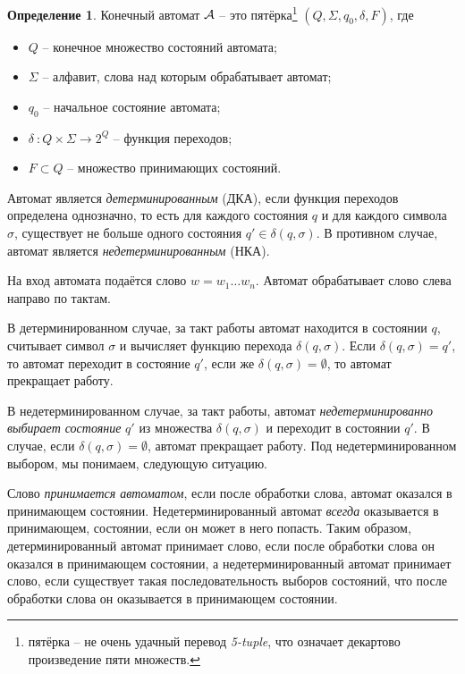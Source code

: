\documentclass[12pt]{article}
\theoremstyle{definiton}
\theoremstyle{definition}
\newtheorem{Def}{Определение}
\let\es\emptyset
\def\A{{\cal A}}
\begin{document}
	\begin{Def}
		Конечный автомат $\A$ -- это пятёрка\footnote{пятёрка -- не очень удачный перевод \emph{5-tuple}, что означает декартово произведение пяти множеств. } $(Q, \Sigma, q_0, \delta, F)$, где
		\begin{itemize}
			\item $Q$ -- конечное множество состояний автомата;
			\item $\Sigma$ -- алфавит, слова над которым обрабатывает автомат;
			\item $q_0$ -- начальное состояние автомата;
			\item $\delta\ : Q \times \Sigma \to 2^Q $ -- функция переходов;
			\item $F \subset Q$ -- множество принимающих состояний.
		\end{itemize}
	\end{Def}

	Автомат является \emph{детерминированным} (ДКА), если функция переходов определена однозначно, то есть для каждого состояния $q$ и для каждого символа $\sigma$, существует не больше одного состояния $q' \in \delta(q, \sigma)$.  В противном случае, автомат является \emph{недетерминированным} (НКА).

	На вход автомата подаётся слово $w = w_1\ldots w_n$. Автомат обрабатывает слово слева направо по тактам. 


	В детерминированном случае, за такт работы автомат находится в состоянии $q$, считывает символ $\sigma$ и вычисляет функцию перехода $\delta(q, \sigma) $. Если  $\delta(q, \sigma)  = q'$, то автомат переходит в состояние $q'$, если же  $\delta(q, \sigma) = \es $, то автомат прекращает работу.


	В недетерминированном случае, за такт работы, автомат \emph{недетерминированно выбирает состояние} $q'$ из множества  $\delta(q, \sigma) $ и переходит в состоянии $q'$. В случае, если  $\delta(q, \sigma) = \es$, автомат прекращает работу. Под недетерминированном выбором, мы понимаем, следующую ситуацию. %


	Слово \emph{принимается автоматом}, если после обработки слова, автомат оказался в принимающем состоянии. Недетерминированный автомат \emph{всегда} оказывается в принимающем, состоянии, если он может в него попасть. 
	Таким образом, детерминированный автомат принимает слово, если после обработки слова он оказался в принимающем состоянии, а недетерминированный автомат принимает слово, если существует такая последовательность выборов состояний, что после обработки слова он оказывается в принимающем состоянии. 
\end{document}
